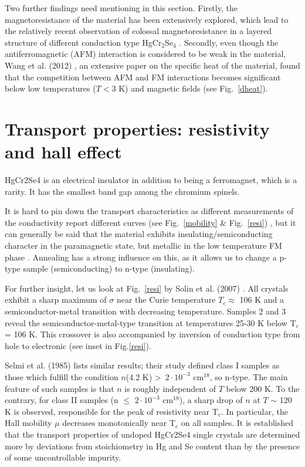 \documentclass[preprint,pre,floats,aps,amsmath,amssymb]{revtex4}
\begin{document}
Two further findings need mentioning in this section. Firstly, the magnetoresistance of the material has been extensively explored, which lead to the relatively recent observation of colossal magnetoresistance in a layered structure of different conduction type HgCr$_2$Se$_4$ \cite{solin1}\cite{solin2}. Secondly, even though the antiferromagnetic (AFM) interaction is considered to be weak in the material, Wang et al. (2012) \cite{wang}, an extensive paper on the specific heat of the material, found that the competition between AFM and FM interactions becomes significant below low temperatures ($T < 3$ K) and magnetic fields (see Fig.~\ref{dheat}).



\section{Transport properties: resistivity and hall effect}

HgCr2Se4 is an electrical insulator in addition to being a ferromagnet, which is a rarity. It has the smallest band gap among the chromium spinels.

It is hard to pin down the transport characteristics as different measurements of the conductivity report different curves (see Fig.~\ref{mobility} \& Fig.~\ref{resi}) \cite{selmi}\cite{solin2}\cite{goldstein}, but it can generally be said that the material exhibits insulating/semiconducting character in the paramagnetic state, but metallic in the low temperature FM phase \cite{xu}.  Annealing has a strong influence on this, as it allows us to change a p-type sample (semiconducting) to n-type (insulating). 

For further insight, let us look at  Fig.~\ref{resi} by  Solin et al. (2007) \cite{solin2}. All crystals exhibit a sharp maximum of $\sigma$ near the Curie temperature $T_c \approx$ 106 K and a semiconductor-metal transition with decreasing temperature. Samples 2 and 3 reveal the semiconductor-metal-type transition at temperatures 25-30 K below T$_c$= 106 K. This crossover is also accompanied by inversion of conduction type from hole to electronic (see inset in Fig.\ref{resi}).

Selmi et al. (1985) \cite{selmi} lists similar results; their study  defined class I samples as those which fulfill the condition $n$(4.2 K) \textgreater~$2\cdot10^{-3}$ cm$^{18}$, so n-type. The main feature of such samples is that $n$ is roughly independent of $T$ below 200 K. To the contrary, for class II samples (n $\le$ $2\cdot10^{-3}$ cm$^{18}$), a sharp drop of $n$ at $T$ $\sim$ 120 K is observed, responsible for the peak of resistivity near T$_c$. In particular, the Hall mobility $\mu$ decreases monotonically near T$_c$ on all samples. It is established\cite{veselago} that the transport properties of undoped HgCr2Se4 single crystals are determined more by deviations from stoichiometry in Hg and Se content than by the presence of some uncontrollable impurity.
 
\end{document}
